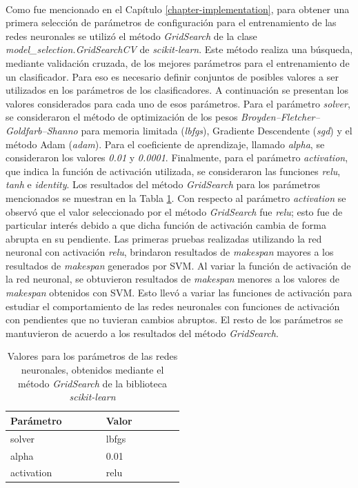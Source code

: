 \paragraph{} Como fue mencionado en el Capítulo \ref{chapter-implementation}, para obtener una primera selección de parámetros de configuración para el entrenamiento de las redes neuronales se utilizó el método \textit{GridSearch} de la clase \textit{model\_selection.GridSearchCV} de \textit{scikit-learn}.
Este método realiza una búsqueda, mediante validación cruzada, de los mejores parámetros para el entrenamiento de un clasificador.
Para eso es necesario definir conjuntos de posibles valores a ser utilizados en los parámetros de los clasificadores.
A continuación se presentan los valores considerados para cada uno de esos parámetros.
Para el parámetro  \textit{solver}, se consideraron el método de optimización de los pesos \textit{Broyden–Fletcher–Goldfarb–Shanno} para memoria limitada (\textit{lbfgs}), Gradiente Descendente (\textit{sgd}) y el método Adam (\textit{adam}).
Para el coeficiente de aprendizaje, llamado \textit{alpha}, se consideraron los valores \textit{0.01} y \textit{0.0001}.
Finalmente, para el parámetro \textit{activation}, que indica la función de activación utilizada, se consideraron las funciones \textit{relu}, \textit{tanh} e \textit{identity}.
Los resultados del método \textit{GridSearch} para los parámetros mencionados se muestran en la Tabla \ref{table:parametros}.
Con respecto al parámetro \textit{activation} se observó que el valor seleccionado por el método \textit{GridSearch} fue \textit{relu}; esto fue de particular interés debido a que dicha función de activación cambia de forma abrupta en su pendiente. Las primeras pruebas realizadas utilizando la red neuronal con activación \textit{relu}, brindaron resultados de \textit{makespan} mayores a los resultados de \textit{makespan} generados por SVM. 
Al variar la función de activación de la red neuronal, se obtuvieron resultados de \textit{makespan} menores a los valores de \textit{makespan} obtenidos con SVM.
Esto llevó a variar las funciones de activación para estudiar el comportamiento de las redes neuronales con funciones de activación con pendientes que no tuvieran cambios abruptos.
El resto de los parámetros se mantuvieron de acuerdo a los resultados del método \textit{GridSearch}.

\begin{table}[h!]
\centering
\begin{tabular}{ |p{0.25\linewidth}|p{0.25\linewidth}| } 
\hline
\textbf{Parámetro} & \textbf{Valor}\\
\hline
solver & lbfgs\\ 
\hline
alpha & 0.01\\ 
\hline
activation & relu\\ 
\hline
\end{tabular}
\caption{ Valores para los parámetros de las redes neuronales, obtenidos mediante el método \textit{GridSearch} de la biblioteca \textit{scikit-learn}}
\label{table:parametros}
\end{table}

